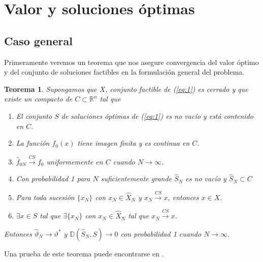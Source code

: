 \documentclass[twoside,a4paper,openright,12pt]{book}
\newtheorem{thm}{Teorema}[section]
\providecommand{\convcs}{\xrightarrow{CS}}
\newcommand{\R}{\mathbb{R}}
\newcommand{\va}{\hat{\vartheta}_N}
\begin{document}
\section{Valor y soluciones óptimas}
\subsection{Caso general}
Primeramente veremos un teorema que nos asegure convergencia del valor óptimo y del conjunto de soluciones factibles en la formulación general del problema.
\begin{thm}
Supongamos que $X$, conjunto factible de (\ref{eq:1}) es cerrado y que existe un compacto de $C\subset \R^n$ tal que 
\begin{enumerate}
\item El conjunto $S$ de soluciones óptimas de (\ref{eq:1}) es no vacío y está contenido en $C$.
\item La función $f_0(x)$ tiene imagen finita y es continua en $C$.
\item $\hat{f}_{0N}\convcs f_0$ uniformemente en $C$ cuando $N\to \infty$.
\item Con probabilidad 1 para $N$ suficientemente grande $\hat{S}_{N}$ es no vacío y $\hat{S}_N\subset C$
\item Para toda sucesión $\{x_N\}$ con $x_N\in \hat{X}_N$ y $x_N\convcs  x$, entonces $x\in X$. 
\item $\exists x\in S$ tal que $\exists\{x_N\}$ con $ x_N \in \hat{X}_N$ tal que $x_N\convcs x$. 
\end{enumerate}
Entonces $\va\to \vartheta^*$ y $\mathbb{D}(\hat{S}_N,S)\to 0$  con probabilidad 1 cuando $N\to \infty$.
\end{thm}
Una prueba de este teorema puede encontrarse en \cite{lecture}.
\end{document}
